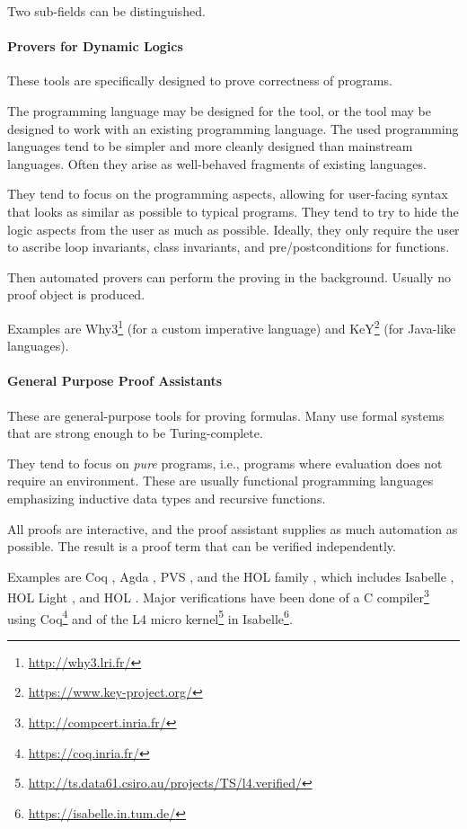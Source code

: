 Two sub-fields can be distinguished.

\paragraph{Provers for Dynamic Logics}
These tools are specifically designed to prove correctness of programs.

The programming language may be designed for the tool, or the tool may be designed to work with an existing programming language.
The used programming languages tend to be simpler and more cleanly designed than mainstream languages.
Often they arise as well-behaved fragments of existing languages.

They tend to focus on the programming aspects, allowing for user-facing syntax that looks as similar as possible to typical programs.
They tend to try to hide the logic aspects from the user as much as possible.
Ideally, they only require the user to ascribe loop invariants, class invariants, and pre/postconditions for functions.

Then automated provers can perform the proving in the background.
Usually no proof object is produced.

Examples are Why3\footnote{\url{http://why3.lri.fr/}} \cite{why3} (for a custom imperative language) and KeY\footnote{\url{https://www.key-project.org/}} \cite{key} (for Java-like languages).


\paragraph{General Purpose Proof Assistants}
These are general-purpose tools for proving formulas.
Many use formal systems that are strong enough to be Turing-complete.

They tend to focus on \emph{pure} programs, i.e., programs where evaluation does not require an environment.
These are usually functional programming languages emphasizing inductive data types and recursive functions.

All proofs are interactive, and the proof assistant supplies as much automation as possible.
The result is a proof term that can be verified independently.

Examples are Coq \cite{coq}, Agda \cite{agda}, PVS \cite{pvs}, and the HOL family \cite{holsemantics}, which includes Isabelle \cite{isabelle}, HOL Light \cite{hollight}, and HOL \cite{hol}.
Major verifications have been done of a C compiler\footnote{\url{http://compcert.inria.fr/}} using Coq\footnote{\url{https://coq.inria.fr/}} and of the L4 micro kernel\footnote{\url{http://ts.data61.csiro.au/projects/TS/l4.verified/}} in Isabelle\footnote{\url{https://isabelle.in.tum.de/}}.

